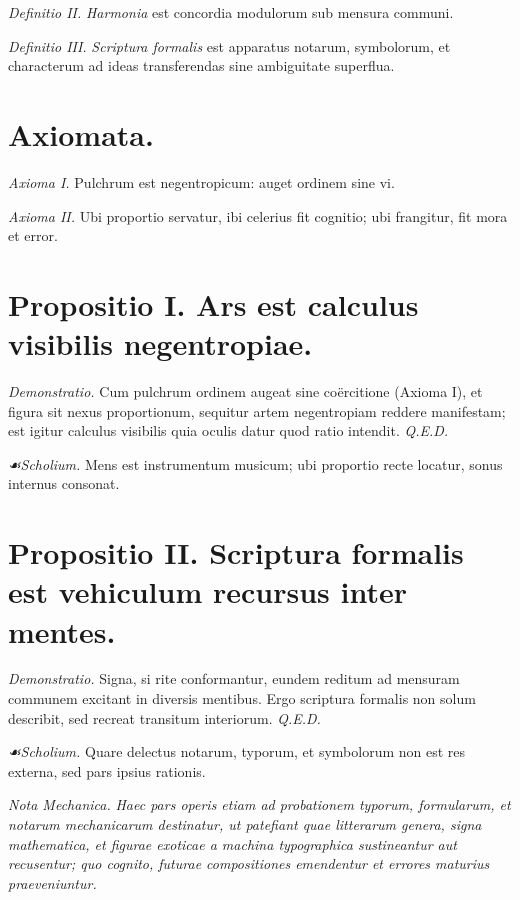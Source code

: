 \documentclass[12pt]{article}
\newcommand{\scholia}{\textit{☙\;}}
\begin{document}
\textit{Definitio II.} \; \textit{Harmonia} est concordia modulorum sub mensura communi.

\textit{Definitio III.} \; \textit{Scriptura formalis} est apparatus notarum, symbolorum, et characterum ad ideas transferendas sine ambiguitate superflua.

\section*{Axiomata.}

\textit{Axioma I.} \; Pulchrum est negentropicum: auget ordinem sine vi.

\textit{Axioma II.} \; Ubi proportio servatur, ibi celerius fit cognitio; ubi frangitur, fit mora et error.

\section*{Propositio I. \; Ars est calculus visibilis negentropiae.}

\textit{Demonstratio.} Cum pulchrum ordinem augeat sine coërcitione (Axioma I), et figura sit nexus proportionum, sequitur artem negentropiam reddere manifestam; est igitur calculus visibilis quia oculis datur quod ratio intendit. \textit{Q.E.D.}

\textit{\scholia Scholium.} Mens est instrumentum musicum; ubi proportio recte locatur, sonus internus consonat.

\section*{Propositio II. \; Scriptura formalis est vehiculum recursus inter mentes.}

\textit{Demonstratio.} Signa, si rite conformantur, eundem reditum ad mensuram communem excitant in diversis mentibus. Ergo scriptura formalis non solum describit, sed recreat transitum interiorum. \textit{Q.E.D.}

\textit{\scholia Scholium.} Quare delectus notarum, typorum, et symbolorum non est res externa, sed pars ipsius rationis.

\vspace{0.75em}
\noindent\textit{Nota Mechanica.} \;
\textit{Haec pars operis etiam ad probationem typorum, formularum, et notarum mechanicarum destinatur, ut patefiant quae litterarum genera, signa mathematica, et figurae exoticae a machina typographica sustineantur aut recusentur; quo cognito, futurae compositiones emendentur et errores maturius praeveniuntur.}
\vspace{0.5em}
\end{document}
